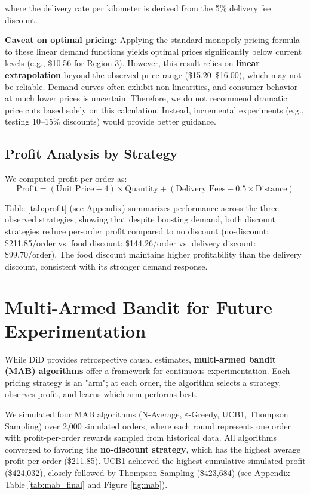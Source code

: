 \documentclass[12pt]{article}
\begin{document}
where the delivery rate per kilometer is derived from the 5\% delivery fee discount.

\textbf{Caveat on optimal pricing:} Applying the standard monopoly pricing formula to these linear demand functions yields optimal prices significantly below current levels (e.g., \$10.56 for Region 3). However, this result relies on \textbf{linear extrapolation} beyond the observed price range (\$15.20--\$16.00), which may not be reliable. Demand curves often exhibit non-linearities, and consumer behavior at much lower prices is uncertain. Therefore, we do not recommend dramatic price cuts based solely on this calculation. Instead, incremental experiments (e.g., testing 10--15\% discounts) would provide better guidance.

\subsection{Profit Analysis by Strategy}

We computed profit per order as:
\[
\text{Profit} = (\text{Unit Price} - 4) \times \text{Quantity} + (\text{Delivery Fees} - 0.5 \times \text{Distance})
\]

Table \ref{tab:profit} (see Appendix) summarizes performance across the three observed strategies, showing that despite boosting demand, both discount strategies reduce per-order profit compared to no discount (no-discount: \$211.85/order vs. food discount: \$144.26/order vs. delivery discount: \$99.70/order). The food discount maintains higher profitability than the delivery discount, consistent with its stronger demand response.

\section{Multi-Armed Bandit for Future Experimentation}

While DiD provides retrospective causal estimates, \textbf{multi-armed bandit (MAB) algorithms} offer a framework for continuous experimentation. Each pricing strategy is an "arm"; at each order, the algorithm selects a strategy, observes profit, and learns which arm performs best.

We simulated four MAB algorithms (N-Average, $\varepsilon$-Greedy, UCB1, Thompson Sampling) over 2,000 simulated orders, where each round represents one order with profit-per-order rewards sampled from historical data. All algorithms converged to favoring the \textbf{no-discount strategy}, which has the highest average profit per order (\$211.85). UCB1 achieved the highest cumulative simulated profit (\$424,032), closely followed by Thompson Sampling (\$423,684) (see Appendix Table \ref{tab:mab_final} and Figure \ref{fig:mab}).
\end{document}
